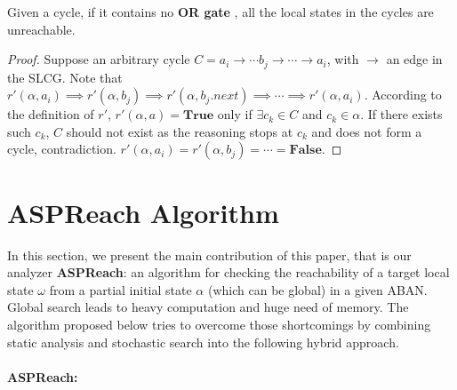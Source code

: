 \documentclass{entcs}
\begin{document}
\begin{theorem}\label{th:break_cycle2}
Given a cycle, if it contains no \textbf{OR gate}%
, all the local states in the cycles are unreachable.
\end{theorem}

\begin{proof}
Suppose an arbitrary cycle $C=a_i\to \cdots b_j\to\cdots \to a_i$, with $\to$ an edge in the SLCG.
Note that $r'(\alpha,a_i)\implies r'(\alpha,b_j)\implies r'(\alpha,b_j.next)\implies \cdots\implies r'(\alpha,a_i)$.
According to the definition of $r'$, $r'(\alpha,a)=\mathbf{True}$ only if $\exists c_k\in C$ and $c_k\in \alpha$.
If there exists such $c_k$, $C$ should not exist as the reasoning stops at $c_k$ and does not form a cycle, contradiction.
$r'(\alpha,a_i)=r'(\alpha,b_j)=\cdots =\mathbf{False}$.
\end{proof}
\section{ASPReach Algorithm}
In this section, we present the main contribution of this paper, that is our analyzer \textbf{ASPReach}: an algorithm for checking the reachability of a target local state $\omega$ from a partial initial state $\alpha$ (which can be global) in a given ABAN.
Global search leads to heavy computation and huge need of memory.
The algorithm proposed below tries to overcome those shortcomings by combining static analysis and stochastic search into the following hybrid approach.


\paragraph{{\bf ASPReach}:}
\end{document}
